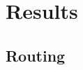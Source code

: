 \documentclass[master,english]{hgbthesis}
\begin{document}
\chapter{Results}
\section{Routing}
\end{document}
